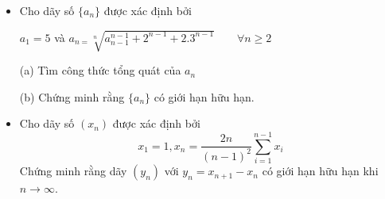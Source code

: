 \documentclass[11pt]{scrartcl}
\begin{document}
\begin{itemize}[label=, leftmargin=0em, itemsep=-0em]

    \item \begin{btvn}
        Cho dãy số $\{a_{n}\}$ được xác định bởi

$a_{1}=5$ và $a_{n=}\sqrt[n]{a_{n-1}^{n-1}+2^{n-1}+2.3^{n-1}} \qquad \forall n\geq2$

(a) Tìm công thức tổng quát của $a_{n}$

(b) Chứng minh rằng $\{a_{n}\}$ có giới hạn hữu hạn.
        
    \end{btvn}

    \item \begin{btvn}
        Cho dãy số $(x_n)$ được xác định bởi
\[x_1=1, x_n=\dfrac{2n}{(n-1)^2}\sum_{i=1}^{n-1}x_i\]
Chứng minh rằng dãy $(y_n)$ với $y_n=x_{n+1}-x_n$ có giới hạn hữu hạn khi $n\to \infty.$
    \end{btvn}

\end{itemize}
\end{document}
